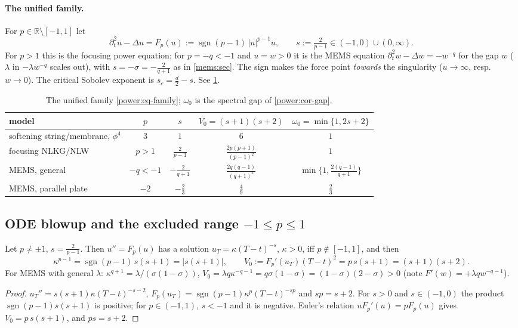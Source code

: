 \paragraph{The unified family.} For $p\in\mathbb R\setminus[-1,1]$ let
\begin{equation}\label{power:eq-family}
  \partial_t^2u-\Delta u=F_p(u):=\operatorname{sgn}(p-1)\,|u|^{p-1}u,\qquad
  s:=\tfrac{2}{p-1}\in(-1,0)\cup(0,\infty).
\end{equation}
For $p>1$ this is the focusing power equation; for $p=-q<-1$ and $u=w>0$ it is
the MEMS equation $\partial_t^2w-\Delta w=-w^{-q}$ for the gap $w$ ($\lambda$ in
$-\lambda w^{-q}$ scales out), with $s=-\sigma=-\frac{2}{q+1}$ as in
\cref{mems:sec}. The sign makes the force point \emph{towards} the singularity
($u\to\infty$, resp.\ $w\to0$). The critical Sobolev exponent is
$s_c=\frac d2-s$. See \cref{power:tab-models}.

\begin{table}[ht]
\centering\small
\begin{tabular}{@{}lcccc@{}}
\toprule
model & $p$ & $s$ & $V_0=(s+1)(s+2)$ & $\omega_0=\min\{1,2s+2\}$\\
\midrule
softening string/membrane, $\phi^4$ & $3$ & $1$ & $6$ & $1$\\
focusing NLKG/NLW & $p>1$ & $\frac{2}{p-1}$ & $\frac{2p(p+1)}{(p-1)^2}$ & $1$\\
MEMS, general & $-q<-1$ & $-\frac{2}{q+1}$ & $\frac{2q(q-1)}{(q+1)^2}$ & $\min\{1,\frac{2(q-1)}{q+1}\}$\\
MEMS, parallel plate & $-2$ & $-\frac23$ & $\frac49$ & $\frac23$\\
\bottomrule
\end{tabular}
\caption{The unified family \eqref{power:eq-family}; $\omega_0$ is the spectral
gap of \cref{power:cor-gap}.}
\label{power:tab-models}
\end{table}

\subsection{ODE blowup and the excluded range \texorpdfstring{$-1\le p\le1$}{-1<=p<=1}}
\label{power:subsec-ode}

\begin{proposition}\label{power:prop-ode}
Let $p\neq\pm1$, $s=\frac2{p-1}$. Then $u''=F_p(u)$ has a solution
$u_T=\kappa(T-t)^{-s}$, $\kappa>0$, iff $p\notin[-1,1]$, and then
\[
  \kappa^{p-1}=\operatorname{sgn}(p-1)\,s(s+1)=|s(s+1)|,\qquad
  V_0:=F_p'(u_T)(T-t)^2=p\,s(s+1)=(s+1)(s+2).
\]
For MEMS with general $\lambda$: $\kappa^{q+1}=\lambda/(\sigma(1-\sigma))$,
$V_0=\lambda q\kappa^{-q-1}=q\sigma(1-\sigma)=(1-\sigma)(2-\sigma)>0$ (note
$F'(w)=+\lambda qw^{-q-1}$).
\end{proposition}
\begin{proof}
$u_T''=s(s+1)\kappa(T-t)^{-s-2}$, $F_p(u_T)=\operatorname{sgn}(p-1)\kappa^p(T-t)^{-sp}$
and $sp=s+2$. For $s>0$ and $s\in(-1,0)$ the product $\operatorname{sgn}(p-1)s(s+1)$
is positive; for $p\in(-1,1)$, $s<-1$ and it is negative. Euler's relation
$uF_p'(u)=pF_p(u)$ gives $V_0=p\,s(s+1)$, and $ps=s+2$.
\end{proof}

